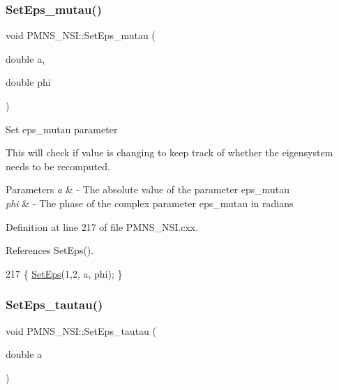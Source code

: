 \subsubsection{\texorpdfstring{Set\+Eps\+\_\+mutau()}{SetEps\_mutau()}}
{\footnotesize\ttfamily void P\+M\+N\+S\+\_\+\+N\+S\+I\+::\+Set\+Eps\+\_\+mutau (\begin{DoxyParamCaption}\item[{double}]{a,  }\item[{double}]{phi }\end{DoxyParamCaption})\hspace{0.3cm}{\ttfamily [virtual]}}

Set eps\+\_\+mutau parameter

This will check if value is changing to keep track of whether the eigensystem needs to be recomputed.


\begin{DoxyParams}{Parameters}
{\em a} & -\/ The absolute value of the parameter eps\+\_\+mutau \\
\hline
{\em phi} & -\/ The phase of the complex parameter eps\+\_\+mutau in radians \\
\hline
\end{DoxyParams}


Definition at line 217 of file P\+M\+N\+S\+\_\+\+N\+S\+I.\+cxx.



References Set\+Eps().


\begin{DoxyCode}
217 \{ \hyperlink{classOscProb_1_1PMNS__NSI_a87c508149ea36b6de493a6817247a0ea}{SetEps}(1,2, a, phi); \}
\end{DoxyCode}
\mbox{\label{classOscProb_1_1PMNS__NSI_a5736f3cd792a621dfa844c3fa314cd17}} 
\subsubsection{\texorpdfstring{Set\+Eps\+\_\+tautau()}{SetEps\_tautau()}}
{\footnotesize\ttfamily void P\+M\+N\+S\+\_\+\+N\+S\+I\+::\+Set\+Eps\+\_\+tautau (\begin{DoxyParamCaption}\item[{double}]{a }\end{DoxyParamCaption})\hspace{0.3cm}{\ttfamily [virtual]}}

